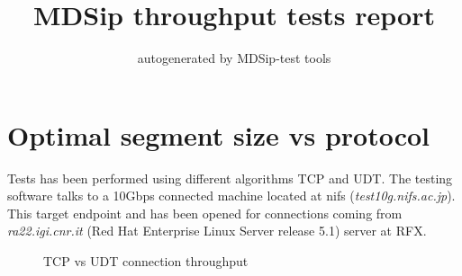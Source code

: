 \documentclass[10pt,a4paper]{article}
\author{autogenerated by MDSip-test tools}
\title{MDSip throughput tests report}
\begin{document}
\maketitle

\section{ Optimal segment size vs protocol }

Tests has been performed using different algorithms TCP and UDT. The testing software talks to a 10Gbps connected machine located at nifs (\emph{test10g.nifs.ac.jp}). This target endpoint and has been opened for connections coming from \emph{ra22.igi.cnr.it} (Red Hat Enterprise Linux Server release 5.1) server at RFX.

\begin{figure}[htbp!]
\centerline{
}
\caption[]
{ TCP vs UDT connection throughput }
\label{fig:size}
\end{figure}
\end{document}
